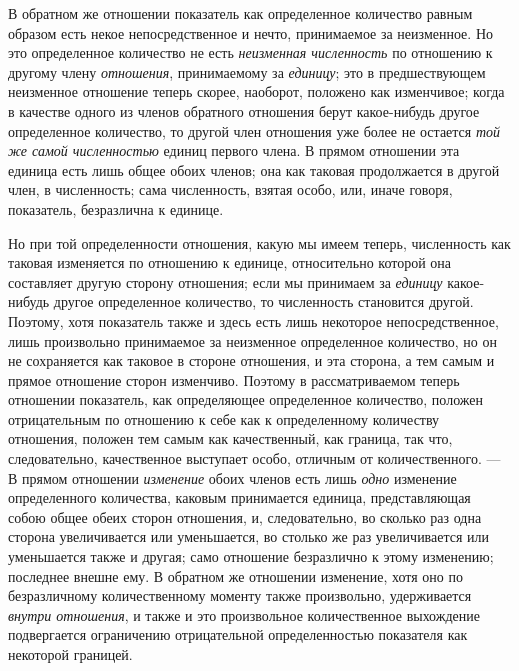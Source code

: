 В обратном же отношении показатель как определенное количество равным
образом есть некое непосредственное и нечто, принимаемое за неизменное. Но
это определенное количество не есть {\em неизменная
численность }по отношению к другому члену
{\em отношения}, принимаемому за
{\em единицу}; это в предшествующем неизменное
отношение теперь скорее, наоборот, положено как изменчивое; когда в
качестве одного из членов обратного отношения берут какое-нибудь другое
определенное количество, то другой член отношения уже более не остается
{\em той же самой численностью} единиц первого члена. В
прямом отношении эта единица есть лишь общее обоих членов; она как таковая
продолжается в другой член, в численность; сама численность, взятая особо,
или, иначе говоря, показатель, безразлична к единице.

Но при той определенности отношения, какую мы имеем теперь, численность как
таковая изменяется по отношению к единице, относительно которой она
составляет другую сторону отношения; если мы принимаем за
{\em единицу} какое-нибудь другое определенное
количество, то численность становится другой. Поэтому, хотя показатель
также и здесь есть лишь некоторое непосредственное, лишь произвольно
принимаемое за неизменное определенное количество, но он не сохраняется как
таковое в стороне отношения, и эта сторона, а тем самым и прямое отношение
сторон изменчиво. Поэтому в рассматриваемом теперь отношении показатель,
как определяющее определенное количество, положен отрицательным по
отношению к себе как к определенному количеству отношения, положен тем
самым как качественный, как граница, так что, следовательно, качественное
выступает особо, отличным от количественного. — В прямом отношении
{\em изменение} обоих членов есть лишь
{\em одно} изменение определенного количества, каковым
принимается единица, представляющая собою общее обеих сторон отношения, и,
следовательно, во сколько раз одна сторона увеличивается или уменьшается,
во столько же раз увеличивается или уменьшается также и другая; само
отношение безразлично к этому изменению; последнее внешне ему. В обратном
же отношении изменение, хотя оно по безразличному количественному моменту
также произвольно, удерживается {\em внутри отношения},
и также и это произвольное количественное выхождение подвергается
ограничению отрицательной определенностью показателя как некоторой
границей.

